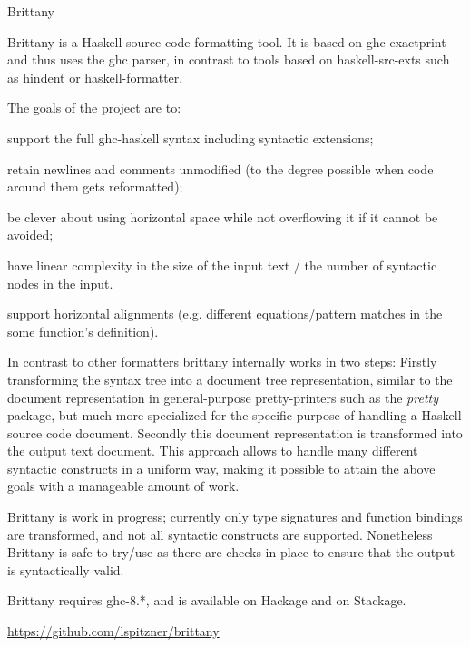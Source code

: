\begin{hcarentry}[updated]{Brittany}
\makeheader

Brittany is a Haskell source code formatting tool. It is based on
ghc-exactprint and thus uses the ghc parser, in contrast to tools based on
haskell-src-exts such as hindent or haskell-formatter.

The goals of the project are to:

\begin{compactitem}
\item support the full ghc-haskell syntax including syntactic extensions;
\item retain newlines and comments unmodified (to the degree possible when
  code around them gets reformatted);
\item be clever about using horizontal space while not overflowing it if it
  cannot be avoided;
\item have linear complexity in the size of the input text / the number of
  syntactic nodes in the input.
\item support horizontal alignments (e.g. different equations/pattern matches
  in the some function's definition).
\end{compactitem}

In contrast to other formatters brittany internally works in two steps:
Firstly transforming the syntax tree into a document tree representation,
similar to the document representation in general-purpose pretty-printers such
as the \emph{pretty} package, but much more specialized for the specific
purpose of handling a Haskell source code document. Secondly this document
representation is transformed into the output text document. This approach
allows to handle many different syntactic constructs in a uniform way, making
it possible to attain the above goals with a manageable amount of work.

Brittany is work in progress; currently only type signatures and function
bindings are transformed, and not all syntactic constructs are supported.
Nonetheless Brittany is safe to try/use as there are checks in place to ensure
that the output is syntactically valid.

Brittany requires ghc-8.*, and is available on Hackage and on Stackage.

\FurtherReading
\begin{compactitem}
  \item \url{https://github.com/lspitzner/brittany}
\end{compactitem}
\end{hcarentry}
